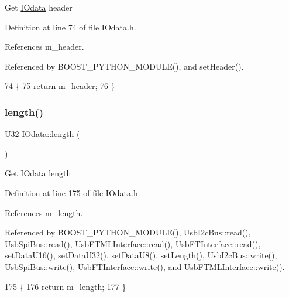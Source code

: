 Get \hyperlink{classIOdata}{I\+Odata} header 

Definition at line 74 of file I\+Odata.\+h.



References m\+\_\+header.



Referenced by B\+O\+O\+S\+T\+\_\+\+P\+Y\+T\+H\+O\+N\+\_\+\+M\+O\+D\+U\+L\+E(), and set\+Header().


\begin{DoxyCode}
74               \{
75     \textcolor{keywordflow}{return} \hyperlink{classIOdata_a46ec7dbfa257c02be1d39c4799f157d3}{m\_header};
76   \}
\end{DoxyCode}
\mbox{\label{classIOdata_abb40e71ce0290832a24857b4a1e7b1a3}} 
\subsubsection{\texorpdfstring{length()}{length()}}
{\footnotesize\ttfamily \hyperlink{classIOdata_a96fb57f5fcd87b708743abd3c86a5198}{U32} I\+Odata\+::length (\begin{DoxyParamCaption}{ }\end{DoxyParamCaption})\hspace{0.3cm}{\ttfamily [inline]}}

Get \hyperlink{classIOdata}{I\+Odata} length 

Definition at line 175 of file I\+Odata.\+h.



References m\+\_\+length.



Referenced by B\+O\+O\+S\+T\+\_\+\+P\+Y\+T\+H\+O\+N\+\_\+\+M\+O\+D\+U\+L\+E(), Usb\+I2c\+Bus\+::read(), Usb\+Spi\+Bus\+::read(), Usb\+F\+T\+M\+L\+Interface\+::read(), Usb\+F\+T\+Interface\+::read(), set\+Data\+U16(), set\+Data\+U32(), set\+Data\+U8(), set\+Length(), Usb\+I2c\+Bus\+::write(), Usb\+Spi\+Bus\+::write(), Usb\+F\+T\+Interface\+::write(), and Usb\+F\+T\+M\+L\+Interface\+::write().


\begin{DoxyCode}
175               \{
176     \textcolor{keywordflow}{return} \hyperlink{classIOdata_afabe57441da019eb614d277799106aac}{m\_length};
177   \}
\end{DoxyCode}
\mbox{\label{classIOdata_aae2073c3bc6bc9f620dc0fca7fccc9a7}} 
